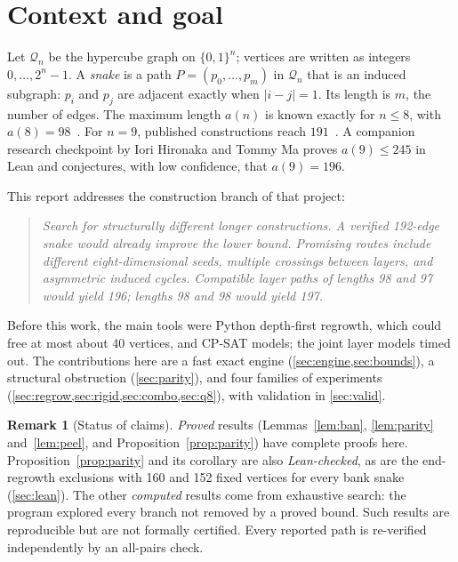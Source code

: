 \documentclass[11pt,a4paper]{article}
\theoremstyle{definition}
\newtheorem{remark}[theorem]{Remark}
\newcommand{\Q}{\mathcal{Q}}
\begin{document}
\section{Context and goal}

Let $\Q_n$ be the hypercube graph on $\{0,1\}^n$; vertices are written as integers $0,\dots,2^n-1$. A \emph{snake} is a path $P=(p_0,\dots,p_m)$ in $\Q_n$ that is an induced subgraph: $p_i$ and $p_j$ are adjacent exactly when $|i-j|=1$. Its length is $m$, the number of edges. The maximum length $a(n)$ is known exactly for $n\le 8$, with $a(8)=98$~\cite{ostergard,oeis}. For $n=9$, published constructions reach $191$~\cite{orland,data}. A companion research checkpoint by Iori Hironaka and Tommy Ma proves $a(9)\le 245$ in Lean and conjectures, with low confidence, that $a(9)=196$.

This report addresses the construction branch of that project:
\begin{quote}\itshape
Search for structurally different longer constructions. A verified 192-edge snake would already improve the lower bound. Promising routes include different eight-dimensional seeds, multiple crossings between layers, and asymmetric induced cycles. Compatible layer paths of lengths 98 and 97 would yield 196; lengths 98 and 98 would yield 197.
\end{quote}
Before this work, the main tools were Python depth-first regrowth, which could free at most about 40 vertices, and CP-SAT models; the joint layer models timed out. The contributions here are a fast exact engine (\cref{sec:engine,sec:bounds}), a structural obstruction (\cref{sec:parity}), and four families of experiments (\cref{sec:regrow,sec:rigid,sec:combo,sec:q8}), with validation in \cref{sec:valid}.

\begin{remark}[Status of claims]
\emph{Proved} results (Lemmas~\ref{lem:ban}, \ref{lem:parity} and~\ref{lem:peel}, and Proposition~\ref{prop:parity}) have complete proofs here. Proposition~\ref{prop:parity} and its corollary are also \emph{Lean-checked}, as are the end-regrowth exclusions with 160 and 152 fixed vertices for every bank snake (\cref{sec:lean}). The other \emph{computed} results come from exhaustive search: the program explored every branch not removed by a proved bound. Such results are reproducible but are not formally certified. Every reported path is re-verified independently by an all-pairs check.
\end{remark}

\end{document}
